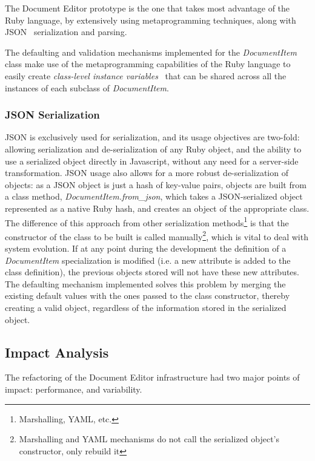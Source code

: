 The Document Editor prototype is the one that takes most advantage of the Ruby language, by extensively using metaprogramming techniques, along with JSON~\cite{rfc4627} serialization and parsing.

The defaulting and validation mechanisms implemented for the \emph{DocumentItem} class make use of the metaprogramming capabilities of the Ruby language to easily create \emph{class-level instance variables}~\cite{class_level_instance_variables} that can be shared across all the instances of each subclass of \emph{DocumentItem}.

\subsubsection{JSON Serialization}\label{sec:fa_documents_implementation_json_serialization}

JSON is exclusively used for serialization, and its usage objectives are two-fold: allowing serialization and de-serialization of any Ruby object, and the ability to use a serialized object directly in Javascript, without any need for a server-side transformation. JSON usage also allows for a more robust de-serialization of objects: as a JSON object is just a hash of key-value pairs, objects are built from a class method, \emph{DocumentItem.from\_json}, which takes a JSON-serialized object represented as a native Ruby hash, and creates an object of the appropriate class. The difference of this approach from other serialization methods\footnote{Marshalling, YAML, etc.} is that the constructor of the class to be built is called manually\footnote{Marshalling and YAML mechanisms do not call the serialized object's constructor, only rebuild it}, which is vital to deal with system evolution. If at any point during the development the definition of a \emph{DocumentItem} specialization is modified (i.e. a new attribute is added to the class definition), the previous objects stored will not have these new attributes. The defaulting mechanism implemented solves this problem by merging the existing default values with the ones passed to the class constructor, thereby creating a valid object, regardless of the information stored in the serialized object.

\subsection{Impact Analysis}\label{sec:fa_documents_impact_analysis}

The refactoring of the Document Editor infrastructure had two major points of impact: performance, and variability.

